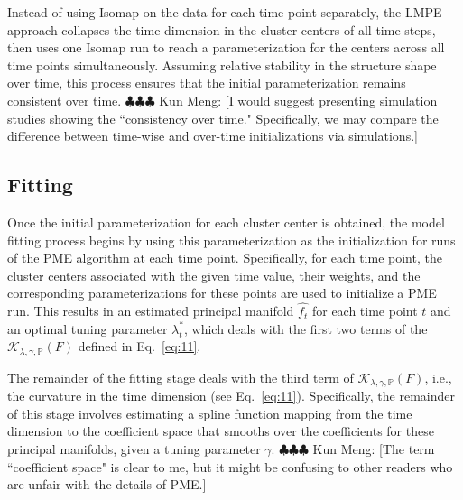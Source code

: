 \documentclass[11pt,reqno]{article}
\newcommand{\meng}[1]{{\color{purple} \sf $\clubsuit\clubsuit\clubsuit$ Kun Meng: [#1]}}
\theoremstyle{definition}
\begin{document}
Instead of using Isomap on the data for each time point separately, the LMPE approach collapses the time dimension in the cluster centers of all time steps, then uses one Isomap run to reach a parameterization for the centers across all time points simultaneously. Assuming relative stability in the structure shape over time, this process ensures that the initial parameterization remains consistent over time. \meng{I would suggest presenting simulation studies showing the ``consistency over time." Specifically, we may compare the difference between time-wise and over-time initializations via simulations.}

\subsection*{Fitting}
Once the initial parameterization for each cluster center is obtained, the model fitting process begins by using this parameterization as the initialization for runs of the PME algorithm at each time point. Specifically, for each time point, the cluster centers associated with the given time value, their weights, and the corresponding parameterizations for these points are used to initialize a PME run. This results in an estimated principal manifold $\widehat{f_t}$ for each time point $t$ and an optimal tuning parameter $\lambda_t^*$, which deals with the first two terms of the $\mathcal{K}_{\lambda, \gamma, \mathbb{P}}(F)$ defined in Eq.~\eqref{eq:11}.

The remainder of the fitting stage deals with the third term of $\mathcal{K}_{\lambda, \gamma, \mathbb{P}}(F)$, i.e., the curvature in the time dimension (see Eq.~\eqref{eq:11}). Specifically, the remainder of this stage involves estimating a spline function mapping from the time dimension to the coefficient space that smooths over the coefficients for these principal manifolds, given a tuning parameter $\gamma$. \meng{The term ``coefficient space" is clear to me, but it might be confusing to other readers who are unfair with the details of PME.}
\end{document}
